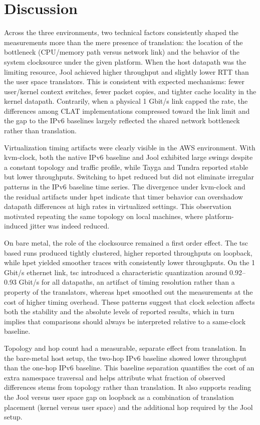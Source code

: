 \section{Discussion}

Across the three environments, two technical factors consistently shaped the measurements more than the mere presence of translation: the location of the bottleneck (CPU/memory path versus network link) and the behavior of the system clocksource under the given platform. When the host datapath was the limiting resource, Jool achieved higher throughput and slightly lower RTT than the user space translators. This is consistent with expected mechanisms: fewer user/kernel context switches, fewer packet copies, and tighter cache locality in the kernel datapath. Contrarily, when a physical 1 Gbit/s link capped the rate, the differences among CLAT implementations compressed toward the link limit and the gap to the IPv6 baselines largely reflected the shared network bottleneck rather than translation.

Virtualization timing artifacts were clearly visible in the AWS environment. With kvm-clock, both the native IPv6 baseline and Jool exhibited large swings despite a constant topology and traffic profile, while Tayga and Tundra reported stable but lower throughputs. Switching to hpet reduced but did not eliminate irregular patterns in the IPv6 baseline time series. The divergence under kvm-clock and the residual artifacts under hpet indicate that timer behavior can overshadow datapath differences at high rates in virtualized settings. This observation motivated repeating the same topology on local machines, where platform-induced jitter was indeed reduced.

On bare metal, the role of the clocksource remained a first order effect. The tsc based runs produced tightly clustered, higher reported throughputs on loopback, while hpet yielded smoother traces with consistently lower throughputs. On the 1 Gbit/s ethernet link, tsc introduced a characteristic quantization around 0.92–0.93 Gbit/s for all datapaths, an artifact of timing resolution rather than a property of the translators, whereas hpet smoothed out the measurements at the cost of higher timing overhead. These patterns suggest that clock selection affects both the stability and the absolute levels of reported results, which in turn implies that comparisons should always be interpreted relative to a same-clock baseline.

Topology and hop count had a measurable, separate effect from translation. In the bare-metal host setup, the two-hop IPv6 baseline showed lower throughput than the one-hop IPv6 baseline. This baseline separation quantifies the cost of an extra namespace traversal and helps attribute what fraction of observed differences stems from topology rather than translation. It also supports reading the Jool versus user space gap on loopback as a combination of translation placement (kernel versus user space) and the additional hop required by the Jool setup.

